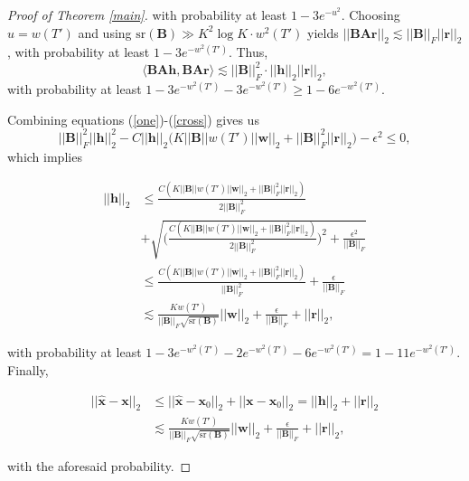 \documentclass{article}
\def \xhat {\mathbf{\hat{x}}}
\begin{document}
\begin{proof}[Proof of Theorem \ref{main}]
with probability at least $1-3e^{-u^2}$. Choosing $u = w(T')$ and using $\mathrm{sr}(\mathbf{B}) \gg K^2 \log K \cdot w^2(T')$ yields $||\mathbf{B}\mathbf{A}\mathbf{r}||_2  \lesssim ||\mathbf{B}||_F ||\mathbf{r}||_2$, with probability at least $1-3e^{-w^2(T')}$.
Thus,
\begin{equation} \label{cross}
    \langle \mathbf{B} \mathbf{A} \mathbf{h}, \mathbf{B} \mathbf{A} \mathbf{r} \rangle \lesssim  ||\mathbf{B}||_F^2 \cdot ||\mathbf{h}||_2 ||\mathbf{r}||_2,
\end{equation}
with probability at least $1-3e^{-w^2(T')}-3e^{-w^2(T')} \geq 1-6e^{-w^2(T')}$.

Combining equations (\ref{one})-(\ref{cross}) gives us
\begin{equation}
    ||\mathbf{B}||_F^2 ||\mathbf{h}||_2^2 - C ||\mathbf{h}||_2  \big( K||\mathbf{B}|| w(T') ||\mathbf{w}||_2 +  ||\mathbf{B}||_F^2 ||\mathbf{r}||_2 \big) - \epsilon^2 \leq 0,
\end{equation}
which implies

    \begin{align}
        ||\mathbf{h}||_2 & \leq \frac{C(K||\mathbf{B}|| w(T') ||\mathbf{w}||_2 +  ||\mathbf{B}||_F^2 ||\mathbf{r}||_2)}{2||\mathbf{B}||_F^2} \\
        &+ \sqrt{\Big( \frac{C(K||\mathbf{B}|| w(T') ||\mathbf{w}||_2 +  ||\mathbf{B}||_F^2 ||\mathbf{r}||_2)}{2||\mathbf{B}||_F^2} \Big)^2 + \frac{\epsilon^2}{||\mathbf{B}||_F}} \\
        & \leq \frac{C(K||\mathbf{B}|| w(T') ||\mathbf{w}||_2 +  ||\mathbf{B}||_F^2 ||\mathbf{r}||_2)}{||\mathbf{B}||_F^2} + \frac{\epsilon}{||\mathbf{B}||_F} \\
        & \lesssim \frac{K w(T')}{||\mathbf{B}||_F \sqrt{\mathrm{sr}(\mathbf{B})}} ||\mathbf{w}||_2 + \frac{\epsilon}{||\mathbf{B}||_F} + ||\mathbf{r}||_2,
    \end{align}

with probability at least $1-3e^{-w^2(T')}-2e^{-w^2(T')} - 6e^{-w^2(T')} = 1-11e^{-w^2(T')}$. Finally,

    \begin{align}
        ||\xhat - \mathbf{x}||_2 & \leq ||\xhat - \mathbf{x}_0||_2 + ||\mathbf{x} - \mathbf{x}_0||_2  = ||\mathbf{h}||_2 + ||\mathbf{r}||_2 \\
        & \lesssim \frac{K w(T')}{||\mathbf{B}||_F \sqrt{\mathrm{sr}(\mathbf{B})}} ||\mathbf{w}||_2 + \frac{\epsilon}{||\mathbf{B}||_F} + ||\mathbf{r}||_2,
    \end{align}

with the aforesaid probability.
\end{proof}
\end{document}
